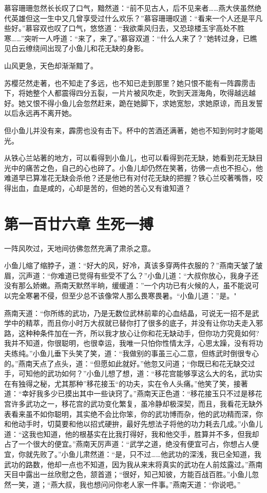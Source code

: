 \documentclass[12pt,oneside]{book}
\begin{document}
慕容珊珊忽然长长叹了口气，黯然道：``前不见古人，后不见来者\ldots\ldots 燕大侠虽然绝代英雄但这一生中又几曾享受过什么欢乐？''慕容珊珊叹道：``看来一个人还是平凡些好。''慕容双也叹了口气，悠悠道：``我欲乘风归去，又恐琼楼玉宇高处不胜寒\ldots\ldots{}''突听一人呼道：``来了，来了。''慕容双道：``什么人来了？''她转过身，已瞧见白云缭绕间出现了小鱼儿和花无缺的身影。

山风更急，天色却渐渐黯了。

苏樱茫然走著，也不知走了多远，也不知已走到那里？她只恨不能有一阵霹雳击下，将她整个人都震得四分五裂，一片片被风吹走，吹到天涯海角，吹得越远越好。她又恨不得小鱼儿会忽然赶来，跪在她脚下，求她宽恕，求她原谅，而且发誓以后永远再不离开她。

但小鱼儿并没有来，霹雳也没有击下。杯中的苦酒还满著，她也不知到何时才能喝光。

从铁心兰站著的地方，可以看得到小鱼儿，也可以看得到花无缺，她看到花无缺目光中的痛苦之色，自己的心也碎了。小鱼儿却仍然在笑著，彷佛一点也不担心，他难道早已算准花无缺会杀他？还是他已有对付花无缺的把握？铁心兰咬著嘴唇，咬得出血，血是咸的，心却是苦的，但她的苦心又有谁知道？

\hypertarget{ux7b2cux4e00ux767eux5effux516dux7ae0-ux751fux6b7bux4e00ux640f}{%
\chapter{第一百廿六章
生死一搏}\label{ux7b2cux4e00ux767eux5effux516dux7ae0-ux751fux6b7bux4e00ux640f}}

一阵风吹过，天地间彷佛忽然充满了肃杀之意。

小鱼儿缩了缩脖子，道：``好大的风，好冷，真该多穿两件衣服的？''燕南天皱了皱眉，沉声道：``你难道已觉得有些受不了么？''小鱼儿道：``大叔你放心，我身子还没有那么娇嫩。燕南天默然半晌，缓缓道：''一个内功已有火候的人，虽不能说可以完全寒暑不侵，但至少总不该像常人那么畏寒畏暑。``小鱼儿道：''是。"

燕南天道：``你所练的武功，乃是无数位武林前辈的心血结晶，可说无一招不是武学中的精萃，而且你小时万大叔就已替你打了很多的底子，并没有让你功夫走入邪路，这种种条件加在一齐，所以我才放心让你和花无缺动手，但你功力究竟如何?我并不知道，你很聪明，也很幸运，我唯一只怕你性情太浮，心思太躁，没有将功夫练纯。''小鱼儿垂下头笑了笑，道：``我做别的事虽三心二意，但练武时倒很专心的。''燕南天点了点头，道：``但愿如此就好。''他忽又问道；``你既已和花无缺交过手，可知他的武功如何？''小鱼儿想了想，道：``移花宫能够享这么大的名，武功实在有独得之秘，尤其那种''移花接玉``的功夫，实在令人头痛。''他笑了笑，接著道：``幸好我多少已摸出其中一些诀窍了。''燕南天正色道：``移花接玉只不过是移花宫许多武功之一，移花宫的武功变化繁复，虽冷静却极深契，而且，我看花无缺外表看来虽不如你聪明，其实绝不会比你笨，你的武功博而杂，他的武功精而深，你和他动手时，切莫要和他以招式硬拚，最好先想法子将他的功力耗去几成。''小鱼儿道：``这我也知道，他的根基实在比我打得好，我和他交手，胜算并不多，但我却占了一个很大的便宜。''燕南天厉声道：``武学之道，绝没有便宜可占，你想占人便宜，你就先败了。''小鱼儿肃然道：``是，只不过\ldots\ldots 他武功的深浅，我已全知道，我武功的路数，他却一点也不知道，因为我从来末将真实的武功在人前炫露过。''燕南天目中露出一丝欣慰之色，颔首道；``很好，知己知彼，方能百战百胜。''小鱼儿忽然一笑，道；``燕大叔，我也想问问你老人家一件事。''燕南天道：``你说吧。''
\end{document}
